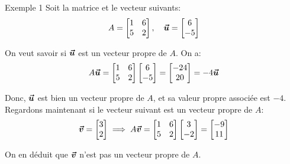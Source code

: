 \documentclass[a4paper]{article}
\begin{document}
\begin{parag}{Exemple 1}
    Soit la matrice et le vecteur suivants:
    \[A = \begin{bmatrix} 1 & 6 \\ 5 & 2 \end{bmatrix}, \quad \bm{\protect\vec{u}} = \begin{bmatrix} 6 \\ -5 \end{bmatrix} \]

    On veut savoir si $\bm{\protect\vec{u}}$ est un vecteur propre de $A$. On a: 
    \[A \bm{\protect\vec{u}} = \begin{bmatrix} 1 & 6 \\ 5 & 2 \end{bmatrix} \begin{bmatrix} 6 \\ -5 \end{bmatrix} = \begin{bmatrix} -24 \\ 20 \end{bmatrix} = -4\bm{\protect\vec{u}}\]
    
    Donc, $\bm{\protect\vec{u}}$ est bien un vecteur propre de $A$, et sa valeur propre associée est $-4$. Regardons maintenant si le vecteur suivant est un vecteur propre de $A$: 
    \[\bm{\protect\vec{v}} = \begin{bmatrix} 3 \\ 2 \end{bmatrix} \implies A \bm{\protect\vec{v}} = \begin{bmatrix} 1 & 6 \\ 5 & 2 \end{bmatrix} \begin{bmatrix} 3 \\ -2 \end{bmatrix} = \begin{bmatrix} -9 \\ 11 \end{bmatrix} \]
    
    On en déduit que $\bm{\protect\vec{v}}$ n'est pas un vecteur propre de $A$.
\end{parag}
\end{document}
